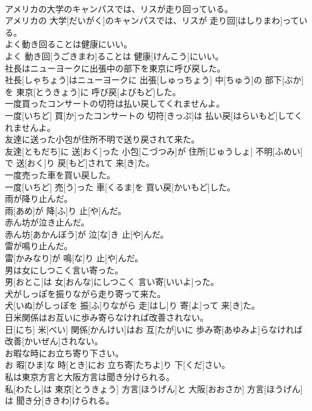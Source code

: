 \documentclass[8pt]{extreport}
\begin{document}
\begin{CJK}{UTF8}{min}
\\	アメリカの大学のキャンパスでは、リスが走り回っている。	
\\	アメリカの 大学[だいがく]のキャンパスでは、リスが 走り回[はしりまわ]っている。
\\	よく動き回ることは健康にいい。	
\\	よく 動き回[うごきまわ]ることは 健康[けんこう]にいい。
\\	社長はニューヨークに出張中の部下を東京に呼び戻した。	
\\	社長[しゃちょう]はニューヨークに 出張[しゅっちょう] 中[ちゅう]の 部下[ぶか]を 東京[とうきょう]に 呼び戻[よびもど]した。
\\	一度買ったコンサートの切符は払い戻してくれませんよ。	
\\	一度[いちど] 買[か]ったコンサートの 切符[きっぷ]は 払い戻[はらいもど]してくれませんよ。
\\	友達に送った小包が住所不明で送り戻されて来た。	
\\	友達[ともだち]に 送[おく]った 小包[こづつみ]が 住所[じゅうしょ] 不明[ふめい]で 送[おく]り 戻[もど]されて 来[き]た。
\\	一度売った車を買い戻した。	
\\	一度[いちど] 売[う]った 車[くるま]を 買い戻[かいもど]した。
\\	雨が降り止んだ。	
\\	雨[あめ]が 降[ふ]り 止[や]んだ。
\\	赤ん坊が泣き止んだ。	
\\	赤ん坊[あかんぼう]が 泣[な]き 止[や]んだ。
\\	雷が鳴り止んだ。	
\\	雷[かみなり]が 鳴[な]り 止[や]んだ。
\\	男は女にしつこく言い寄った。	
\\	男[おとこ]は 女[おんな]にしつこく 言い寄[いいよ]った。
\\	犬がしっぽを振りながら走り寄って来た。	
\\	犬[いぬ]がしっぽを 振[ふ]りながら 走[はし]り 寄[よ]って 来[き]た。
\\	日米関係はお互いに歩み寄らなければ改善されない。	
\\	日[にち] 米[べい] 関係[かんけい]はお 互[たが]いに 歩み寄[あゆみよ]らなければ 改善[かいぜん]されない。
\\	お暇な時にお立ち寄り下さい。	
\\	お 暇[ひま]な 時[とき]にお 立ち寄[たちよ]り 下[くだ]さい。
\\	私は東京方言と大阪方言は聞き分けられる。	
\\	私[わたし]は 東京[とうきょう] 方言[ほうげん]と 大阪[おおさか] 方言[ほうげん]は 聞き分[ききわ]けられる。

\end{CJK}
\end{document}

